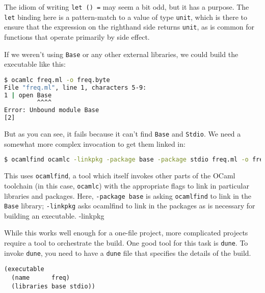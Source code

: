 The idiom of writing \passthrough{\lstinline!let () =!} may seem a bit
odd, but it has a purpose. The \passthrough{\lstinline!let!} binding
here is a pattern-match to a value of type
\passthrough{\lstinline!unit!}, which is there to ensure that the
expression on the righthand side returns \passthrough{\lstinline!unit!},
as is common for functions that operate primarily by side effect.

If we weren't using \passthrough{\lstinline!Base!} or any other external
libraries, we could build the executable like this:

\begin{lstlisting}[language=bash]
$ ocamlc freq.ml -o freq.byte
File "freq.ml", line 1, characters 5-9:
1 | open Base
         ^^^^
Error: Unbound module Base
[2]
\end{lstlisting}

But as you can see, it fails because it can't find
\passthrough{\lstinline!Base!} and \passthrough{\lstinline!Stdio!}. We
need a somewhat more complex invocation to get them linked in:

\begin{lstlisting}[language=bash]
$ ocamlfind ocamlc -linkpkg -package base -package stdio freq.ml -o freq.byte
\end{lstlisting}

This uses \passthrough{\lstinline!ocamlfind!}, a tool which itself
invokes other parts of the OCaml toolchain (in this case,
\passthrough{\lstinline!ocamlc!}) with the appropriate flags to link in
particular libraries and packages. Here,
\passthrough{\lstinline!-package base!} is asking
\passthrough{\lstinline!ocamlfind!} to link in the
\passthrough{\lstinline!Base!} library;
\passthrough{\lstinline!-linkpkg!} asks ocamlfind to link in the
packages as is necessary for building an executable. {-linkpkg}

While this works well enough for a one-file project, more complicated
projects require a tool to orchestrate the build. One good tool for this
task is \passthrough{\lstinline!dune!}. To invoke
\passthrough{\lstinline!dune!}, you need to have a
\passthrough{\lstinline!dune!} file that specifies the details of the
build. 

\begin{lstlisting}
(executable
  (name      freq)
  (libraries base stdio))
\end{lstlisting}


